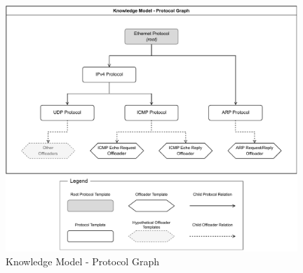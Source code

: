 \begin{figure}[htb]
    \caption{Knowledge Model - Protocol Graph}
    \begin{center}
        \includegraphics[width=0.98\textwidth]{images/icmp_ex_protocol_graph.pdf}  
    \end{center}
    \label{fig:protocol_graph}
\end{figure}







